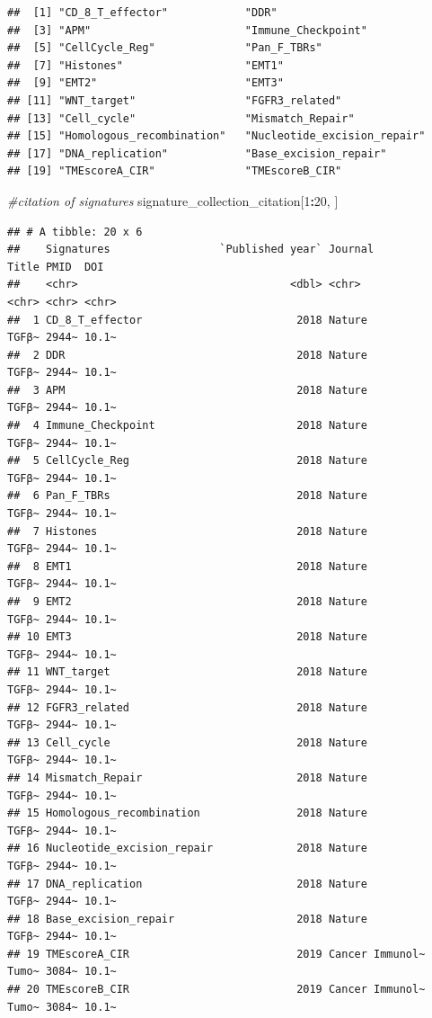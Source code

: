 \documentclass[
  12pt,
]{book}
\newenvironment{Shaded}{\begin{snugshade}}{\end{snugshade}}
\newcommand{\CommentTok}[1]{\textcolor[rgb]{0.56,0.35,0.01}{\textit{#1}}}
\newcommand{\DecValTok}[1]{\textcolor[rgb]{0.00,0.00,0.81}{#1}}
\newcommand{\NormalTok}[1]{#1}
\newcommand{\SpecialCharTok}[1]{\textcolor[rgb]{0.81,0.36,0.00}{\textbf{#1}}}
\begin{document}
\begin{verbatim}
##  [1] "CD_8_T_effector"            "DDR"                       
##  [3] "APM"                        "Immune_Checkpoint"         
##  [5] "CellCycle_Reg"              "Pan_F_TBRs"                
##  [7] "Histones"                   "EMT1"                      
##  [9] "EMT2"                       "EMT3"                      
## [11] "WNT_target"                 "FGFR3_related"             
## [13] "Cell_cycle"                 "Mismatch_Repair"           
## [15] "Homologous_recombination"   "Nucleotide_excision_repair"
## [17] "DNA_replication"            "Base_excision_repair"      
## [19] "TMEscoreA_CIR"              "TMEscoreB_CIR"
\end{verbatim}

\begin{Shaded}
\begin{Highlighting}[]
\CommentTok{\#citation of signatures}
\NormalTok{signature\_collection\_citation[}\DecValTok{1}\SpecialCharTok{:}\DecValTok{20}\NormalTok{, ]}
\end{Highlighting}
\end{Shaded}

\begin{verbatim}
## # A tibble: 20 x 6
##    Signatures                 `Published year` Journal         Title PMID  DOI  
##    <chr>                                 <dbl> <chr>           <chr> <chr> <chr>
##  1 CD_8_T_effector                        2018 Nature          TGFβ~ 2944~ 10.1~
##  2 DDR                                    2018 Nature          TGFβ~ 2944~ 10.1~
##  3 APM                                    2018 Nature          TGFβ~ 2944~ 10.1~
##  4 Immune_Checkpoint                      2018 Nature          TGFβ~ 2944~ 10.1~
##  5 CellCycle_Reg                          2018 Nature          TGFβ~ 2944~ 10.1~
##  6 Pan_F_TBRs                             2018 Nature          TGFβ~ 2944~ 10.1~
##  7 Histones                               2018 Nature          TGFβ~ 2944~ 10.1~
##  8 EMT1                                   2018 Nature          TGFβ~ 2944~ 10.1~
##  9 EMT2                                   2018 Nature          TGFβ~ 2944~ 10.1~
## 10 EMT3                                   2018 Nature          TGFβ~ 2944~ 10.1~
## 11 WNT_target                             2018 Nature          TGFβ~ 2944~ 10.1~
## 12 FGFR3_related                          2018 Nature          TGFβ~ 2944~ 10.1~
## 13 Cell_cycle                             2018 Nature          TGFβ~ 2944~ 10.1~
## 14 Mismatch_Repair                        2018 Nature          TGFβ~ 2944~ 10.1~
## 15 Homologous_recombination               2018 Nature          TGFβ~ 2944~ 10.1~
## 16 Nucleotide_excision_repair             2018 Nature          TGFβ~ 2944~ 10.1~
## 17 DNA_replication                        2018 Nature          TGFβ~ 2944~ 10.1~
## 18 Base_excision_repair                   2018 Nature          TGFβ~ 2944~ 10.1~
## 19 TMEscoreA_CIR                          2019 Cancer Immunol~ Tumo~ 3084~ 10.1~
## 20 TMEscoreB_CIR                          2019 Cancer Immunol~ Tumo~ 3084~ 10.1~
\end{verbatim}
\end{document}
